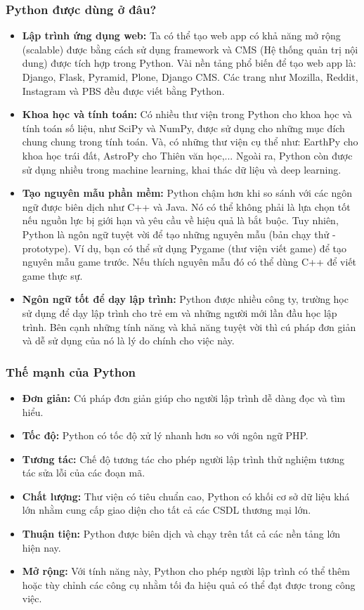 \subsubsection{Python được dùng ở đâu?}
\begin{itemize}
    \item \textbf{Lập trình ứng dụng web:} Ta có thể tạo web app có khả năng mở rộng (scalable) được bằng cách sử dụng framework và CMS (Hệ thống quản trị nội dung) được tích hợp trong Python. Vài nền tảng phổ biến để tạo web app là:  Django, Flask, Pyramid, Plone, Django CMS. Các trang như Mozilla, Reddit, Instagram và PBS đều được viết bằng Python.
    \item \textbf{Khoa học và tính toán:} Có nhiều thư viện trong Python cho khoa học và tính toán số liệu, như SciPy và NumPy, được sử dụng cho những mục đích chung chung trong tính toán. Và, có những thư viện cụ thể như: EarthPy cho khoa học trái đất, AstroPy cho Thiên văn học,... Ngoài ra, Python còn được sử dụng nhiều trong machine learning, khai thác dữ liệu và deep learning.
    \item \textbf{Tạo nguyên mẫu phần mềm:} Python chậm hơn khi so sánh với các ngôn ngữ được biên dịch như C++ và Java. Nó có thể không phải là lựa chọn tốt nếu nguồn lực bị giới hạn và yêu cầu về hiệu quả là bắt buộc. Tuy nhiên, Python là ngôn ngữ tuyệt vời để tạo những nguyên mẫu (bản chạy thử - prototype). Ví dụ, bạn có thể sử dụng Pygame (thư viện viết game) để tạo nguyên mẫu game trước. Nếu thích nguyên mẫu đó có thể dùng C++ để viết game thực sự.
    \item \textbf{Ngôn ngữ tốt để dạy lập trình:} Python được nhiều công ty, trường học sử dụng để dạy lập trình cho trẻ em và những người mới lần đầu học lập trình. Bên cạnh những tính năng và khả năng tuyệt vời thì cú pháp đơn giản và dễ sử dụng của nó là lý do chính cho việc này.
\end{itemize}
\subsubsection{Thế mạnh của Python}
\begin{itemize}
  \item \textbf{Đơn giản:} Cú pháp đơn giản giúp cho người lập trình dễ dàng đọc và tìm hiểu.
  \item \textbf{Tốc độ:} Python có tốc độ xử lý nhanh hơn so với ngôn ngữ PHP.
  \item \textbf{Tương tác:} Chế độ tương tác cho phép người lập trình thử nghiệm tương tác sửa lỗi của các đoạn mã.
  \item \textbf{Chất lượng:} Thư viện có tiêu chuẩn cao, Python có khối cơ sở dữ liệu khá lớn nhằm cung cấp giao diện cho tất cả các CSDL thương mại lớn.
  \item \textbf{Thuận tiện:} Python được biên dịch và chạy trên tất cả các nền tảng lớn hiện nay.
  \item \textbf{Mở rộng:} Với tính năng này, Python cho phép người lập trình có thể thêm hoặc tùy chỉnh các công cụ nhằm tối đa hiệu quả có thể đạt được trong công việc.
\end{itemize}
